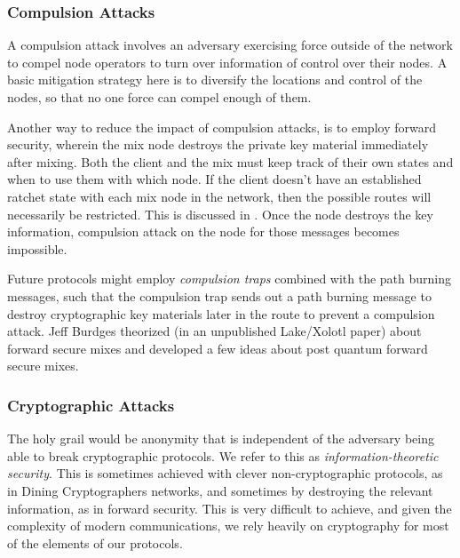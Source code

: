 \documentclass{article}
\begin{document}
\subsubsection{Compulsion Attacks}

A compulsion attack involves an adversary exercising force outside of the network to compel node operators to turn over information of control over their nodes. A basic mitigation strategy here is to diversify the locations and control of the nodes, so that no one force can compel enough of them.

Another way to reduce the impact of compulsion attacks, is to employ forward security, wherein the mix node destroys the private key material immediately after mixing. Both the client and the mix must keep track of their own states and when to use them with which node. If the client doesn't have an established ratchet state with each mix node in the network, then the possible routes will necessarily be restricted. This is discussed in . Once the node destroys the key information, compulsion attack on the node for those messages becomes impossible.

Future protocols might employ \textit{compulsion traps} combined with the path burning messages, such that the compulsion trap sends out a path burning message to destroy cryptographic key materials later in the route to prevent a compulsion attack. Jeff Burdges theorized (in an unpublished Lake/Xolotl paper) about forward secure mixes and developed a few ideas about post quantum forward secure mixes.


\subsubsection{Cryptographic Attacks}

The holy grail would be anonymity that is independent of the adversary being able to break cryptographic protocols. We refer to this as \textit{information-theoretic security}. This is sometimes achieved with clever non-cryptographic protocols, as in Dining Cryptographers networks, and sometimes by destroying the relevant information, as in forward security. This is very difficult to achieve, and given the complexity of modern communications, we rely heavily on cryptography for most of the elements of our protocols.
\end{document}
